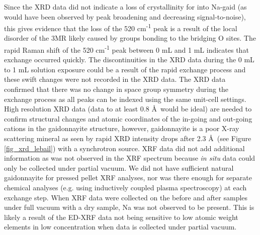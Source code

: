 \documentclass[journal=acsodf,manuscript=article]{achemso}
\begin{document}
Since the XRD data did not indicate a loss of crystallinity for
 into Na-gaid (as would have been observed by peak
broadening and decreasing signal-to-noise), this gives evidence that the
loss of the 520 cm\textsuperscript{-1} peak is a result of the local
disorder of the 3MR likely caused by  groups
bonding to the bridging O sites.  The rapid Raman shift of the 520
cm\textsuperscript{-1} peak between 0 mL and 1 mL indicates that
 exchange occurred quickly.  The discontinuities in
the XRD data during the 0 mL to 1 mL solution exposure could be a result
of the rapid exchange process and these swift changes were not recorded
in the XRD data. The XRD data confirmed that there was no change in
space group symmetry during the exchange process as all peaks can be indexed using the same unit-cell settings.  High resolution XRD
data (data to at least 0.8 \AA\ would be ideal) are needed to confirm
structural changes and atomic coordinates of the in-going and out-going
cations in the gaidonnayite structure, however, gaidonnayite is a poor
X-ray scattering mineral as seen by rapid XRD intensity drops after 2.3 \AA\ (see Figure {\ref{fig_xrd_lebail}}) with a synchrotron
source.  XRF data did not add additional information as
 was not observed in the XRF spectrum
because \emph{in situ} data could only be collected under partial
vacuum.  We did not have sufficient natural gaidonnayite for pressed
pellet XRF analyses, nor was there enough for separate chemical analyses
(e.g. using inductively coupled plasma spectroscopy) at each exchange step. When
XRF data were collected on the before and after samples under full
vacuum with a dry sample, Na was not observed to be present.  This is
likely a result of the ED-XRF data not being sensitive to low atomic
weight elements in low concentration when data is collected under
partial vacuum.
\end{document}

